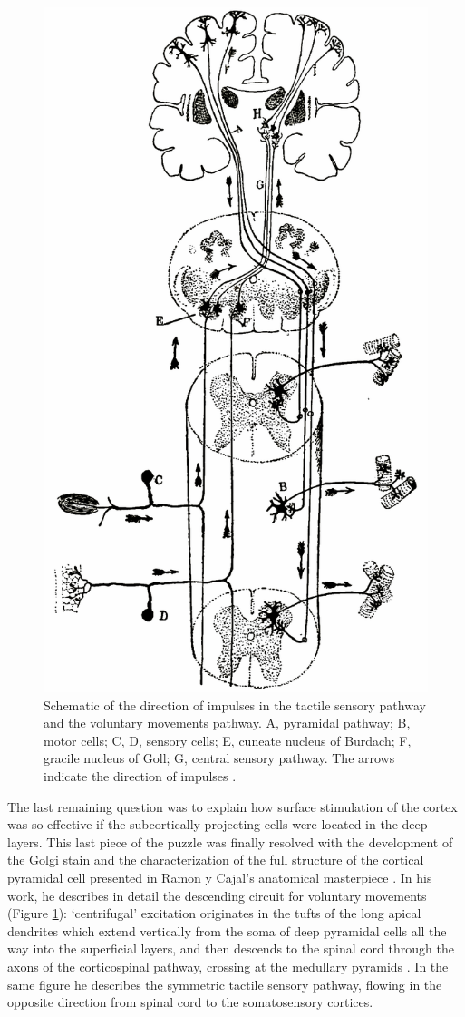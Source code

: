\begin{figure}
\begin{center}
\includegraphics[width=0.65\columnwidth]{chapters/figuresChTeleology/cajalPathway}
\end{center}
\vspace{-5mm}
\caption{Schematic of the direction of impulses in the tactile sensory pathway and the voluntary movements pathway. A, pyramidal pathway; B, motor cells; C, D, sensory cells; E, cuneate nucleus of Burdach; F, gracile nucleus of Goll; G, central sensory pathway. The arrows indicate the direction of impulses \protect\cite[p.540]{RamonYCajal1909}.}
\label{fig:cajalPathway}
\end{figure}

The last remaining question was to explain how surface stimulation of the cortex was so effective if the subcortically projecting cells were located in the deep layers. This last piece of the puzzle was finally resolved with the development of the Golgi stain and the characterization of the full structure of the cortical pyramidal cell presented in Ramon y Cajal's anatomical masterpiece \cite{RamonYCajal1894,RamonYCajal1909}. In his work, he describes in detail the descending circuit for voluntary movements (Figure \ref{fig:cajalPathway}): ‘centrifugal’ excitation originates in the tufts of the long apical dendrites which extend vertically from the soma of deep pyramidal cells all the way into the superficial layers, and then descends to the spinal cord through the axons of the corticospinal pathway, crossing at the medullary pyramids \cite{RamonYCajal1909}. In the same figure he describes the symmetric tactile sensory pathway, flowing in the opposite direction from spinal cord to the somatosensory cortices.


